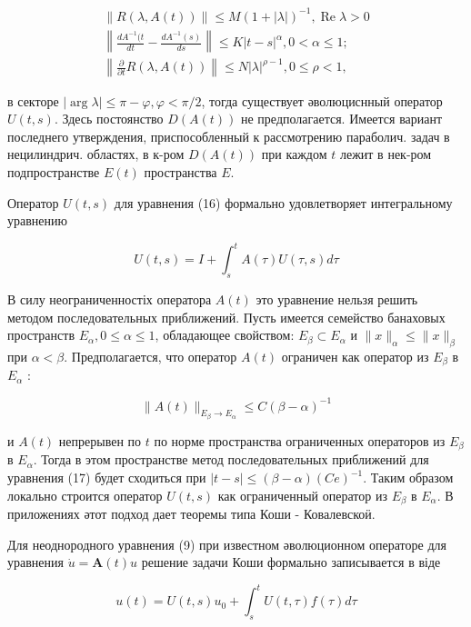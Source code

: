 \documentclass[10pt]{article}
\begin{document}
\[

\begin{gathered}

\|R(\lambda, A(t))\| \leqslant M(1+|\lambda|)^{-1}, \operatorname{Re} \lambda>0 \\

\left\|\frac{d A^{-1}(t}{d t}-\frac{d A^{-1}(s)}{d s}\right\| \leqslant K|t-s|^{\alpha}, 0<\alpha \leqslant 1 ; \\

\left\|\frac{\partial}{\partial t} R(\lambda, A(t))\right\| \leqslant N|\lambda|^{\rho-1}, 0 \leqslant \rho<1,

\end{gathered}

\]



в секторе $|\arg \lambda| \leqslant \pi-\varphi, \varphi<\pi / 2$, тогда существует әволюциснный оператор $U(t, s)$. Здесь постоянство $D(A(t))$ не предполагается. Имеется вариант последнего утверждения, приспособленный к рассмотрению параболич. задач в нецилиндрич. областях, в к-ром $D(A(t))$ при каждом $t$ лежит в нек-ром подпространстве $E(t)$ пространства $E$.



Оператор $U(t, s)$ для уравнения (16) формально удовлетворяет интегральному уравнению



\[

U(t, s)=I+\int_{s}^{t} A(\tau) U(\tau, s) d \tau

\]



В силу неограниченностіх оператора $A(t)$ это уравнение нельзя решить методом последовательных приближений. Пусть имеется семейство банаховых пространств $E_{\alpha}, 0 \leqslant \alpha \leqslant 1$, обладающее свойством: $E_{\beta} \subset E_{\alpha}$ и $\|x\|_{\alpha} \leqslant\|x\|_{\beta}$ при $\alpha<\beta$. Предполагается, что оператор $A(t)$ ограничен как оператор из $E_{\beta}$ в $E_{\alpha}$ :



\[

\|A(t)\|_{E_{\beta} \rightarrow E_{\alpha}} \leqslant C(\beta-\alpha)^{-1}

\]



и $A(t)$ непрерывен по $t$ по норме пространства ограниченных операторов из $E_{\beta}$ в $E_{\alpha}$. Тогда в этом пространстве метод последовательных приближений для уравнения (17) будет сходиться при $|t-s| \leqslant(\beta-\alpha)(C e)^{-1}$. Таким образом локально строится оператор $U(t, s)$ как ограниченный оператор из $E_{\beta}$ в $E_{\alpha}$. В приложениях әтот подход дает теоремы типа Коши - Ковалевскоӥ.



Для неоднородного уравнения (9) при известном әволюционном операторе для уравнения $\dot{u}=\boldsymbol{A}(t) u$ решение задачи Коши формально записывается в віде



\[

u(t)=U(t, s) u_{0}+\int_{s}^{t} U(t, \tau) f(\tau) d \tau

\]
\end{document}
